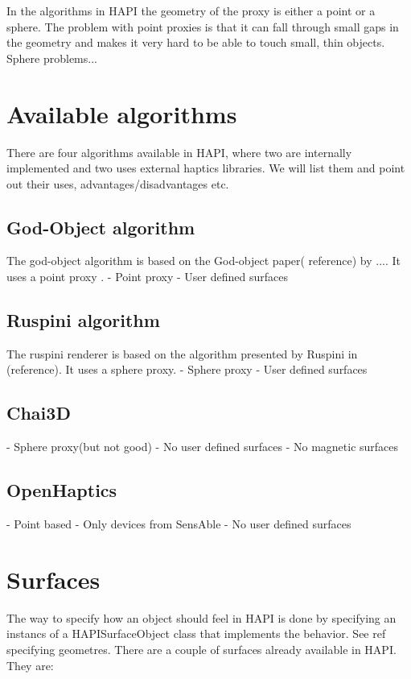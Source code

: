 In the algorithms in HAPI the geometry of the proxy is either a point
or a sphere. The problem with point proxies is that it can fall
through small gaps in the geometry and makes it very hard to be able
to touch small, thin objects. Sphere problems... 

\section{Available algorithms}
There are four algorithms available in HAPI, where two are internally
implemented and two uses external haptics libraries. We will list them
and point out their uses, advantages/disadvantages etc.

\subsection{God-Object algorithm}
The god-object algorithm is based on the God-object paper( reference)
by .... It uses a point proxy .
- Point proxy
- User defined surfaces

\subsection{Ruspini algorithm}
The ruspini renderer is based on the algorithm presented by Ruspini in
(reference). It uses a sphere proxy.
- Sphere proxy
- User defined surfaces


\subsection{Chai3D}
- Sphere proxy(but not good)
- No user defined surfaces
- No magnetic surfaces

\subsection{OpenHaptics}
- Point based
- Only devices from SensAble
- No user defined surfaces

\section{Surfaces}
The way to specify how an object should feel in HAPI is done by
specifying an instancs of a HAPISurfaceObject class that implements
the behavior. See ref specifying geometres. There are a couple of
surfaces already available in HAPI. They are:

